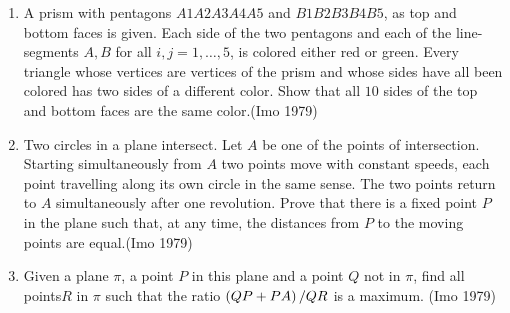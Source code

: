 \begin{enumerate}
\item A prism with pentagons $A1 A2 A3 A4 A5$ and $B1 B2 B3 B4 B5$, as top and bottom faces is given. Each side of the two pentagons and each of the line- segments $A,B$ for all $i, j = 1,\ldots,5$, is colored either red or green. Every triangle whose vertices are vertices of the prism and whose sides have all been colored has two sides of a different color. Show that all $10$ sides of the top and bottom faces are the same color.\hfill(Imo 1979) 
\item Two circles in a plane intersect. Let $A$ be one of the points of intersection. Starting simultaneously from $A$ two points move with constant speeds, each point travelling along its own circle in the same sense. The two points return to $A$ simultaneously after one revolution. Prove that there is a fixed point $P$ in the plane such that, at any time, the distances from $P$ to the moving points are equal.\hfill(Imo 1979) 
\item Given a plane $\pi$, a point $P$ in this plane and a point $Q$ not in $\pi$, find all points$R$ in $\pi$ such that the ratio $\left(QP+PA\right)/Q R$ is a maximum. \hfill(Imo 1979)
\end{enumerate}

